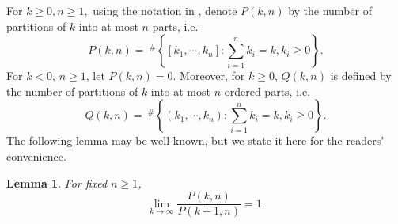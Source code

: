 \documentclass[11pt]{article}
\theoremstyle{plain}
\newtheorem{lem}[thm]{Lemma}
\theoremstyle{definition}
\begin{document}
For $k\geq 0, n\geq 1,$ using the notation in \cite[Page 55]{FJbook}, denote $P(k,n)$  by the number of partitions of $k$ into at most $n$ parts, i.e.
\begin{equation}\label{pkn}P(k,n)=\ ^{\#  }\left \{ [k_{1},\cdots,k_{n}] :\sum\limits_{i=1}^{n}k_{i}=k, k_{i}\ge0  \right \}.\end{equation} For $k<0$, $n \ge 1$, let $P(k,n)=0$.
Moreover, for $k\geq 0$, $Q(k,n)$ is defined by the number of partitions of $k$ into at most $n$ ordered parts, i.e.
$$Q(k,n)=\ ^{\#  }\left \{ \left ( k_{1},\cdots,k_{n} \right ) :\sum\limits_{i=1}^{n}k_{i}=k, k_{i}\ge0  \right \}.$$
The following lemma may be well-known, but we state it here for the readers' convenience.
\begin{lem}\label{lemma2.5}
	For fixed $n \ge 1$,
	$$\lim_{k \to \infty} \frac{P(k,n)}{P(k+1,n)} =1.$$
\end{lem}
\end{document}
